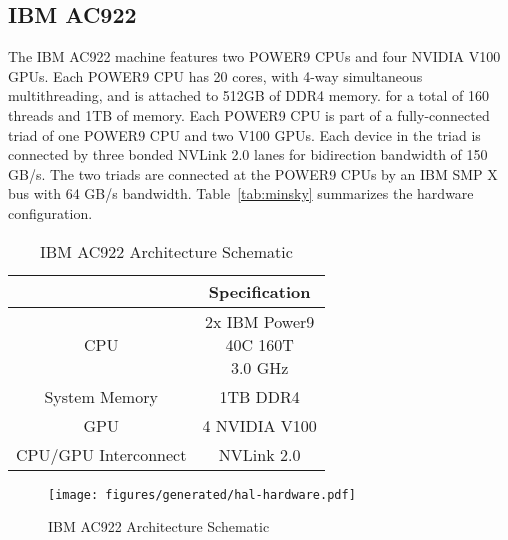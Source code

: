\subsection{IBM AC922}
\label{sec:ac922}

The IBM AC922 machine features two POWER9 CPUs and four NVIDIA V100 GPUs\cite{caldeira2018ac922}.
Each POWER9 CPU has 20 cores, with 4-way simultaneous multithreading, and is attached to 512GB of DDR4 memory. for a total of 160 threads and 1TB of memory.
Each POWER9 CPU is part of a fully-connected triad of one POWER9 CPU and two V100 GPUs.
Each device in the triad is connected by three bonded NVLink 2.0 lanes for bidirection bandwidth of 150 GB/s.
The two triads are connected at the POWER9 CPUs by an IBM SMP X bus with 64 GB/s bandwidth.
Table~\ref{tab:minsky} summarizes the hardware configuration.

\begin{table}[]
    \centering
    \caption[IBM AC922 Architecture Summary]{IBM AC922 Architecture Schematic}
    \label{tab:hal}
    \begin{tabular}{|c|c|}
    \hline
    \textbf{} & \textbf{Specification}                              \\ \hline
    CPU                   & \makecell{2x IBM Power9 \\ 40C 160T \\ 3.0 GHz  }  \\ \hline
    System Memory         & 1TB DDR4                                   \\ \hline
	GPU                   & 4 NVIDIA V100                                   \\ \hline
	CPU/GPU Interconnect  & NVLink 2.0                                      \\ \hline
    \end{tabular}
\end{table}

\begin{figure}
    \centering
	\texttt{[image: figures/generated/hal-hardware.pdf]}
    \caption[IBM AC922 Architecture Schematic]{IBM AC922 Architecture Schematic}
    \label{fig:topo-dgx-simple}
\end{figure}




